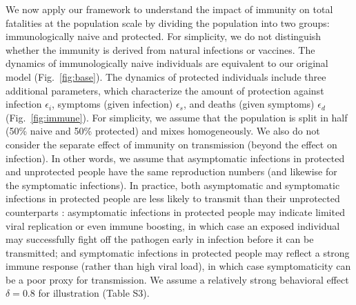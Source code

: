 \documentclass[12pt]{article}
\newcommand{\fref}[1]{Fig.~\ref{fig:#1}}
\begin{document}
We now apply our framework to understand the impact of immunity on total fatalities at the population scale by dividing the population into two groups: immunologically naive and protected.
For simplicity, we do not distinguish whether the immunity is derived from natural infections or vaccines.
The dynamics of immunologically naive individuals are equivalent to our original model (\fref{base}).
The dynamics of protected individuals include three additional parameters, which characterize the amount of protection against infection $\epsilon_i$, symptoms (given infection) $\epsilon_s$, and deaths (given symptoms) $\epsilon_d$ (\fref{immune}).
For simplicity, we assume that the population is split in half (50\% naive and 50\% protected) and mixes homogeneously. We also do not consider the separate effect of immunity on transmission (beyond the effect on infection). 
In other words, we assume that asymptomatic infections in protected and unprotected people have the same reproduction numbers (and likewise for the symptomatic infections).
In practice, both asymptomatic and symptomatic infections in protected people are less likely to transmit than their unprotected counterparts \cite{lipsitch2020understanding}: asymptomatic infections in protected people may indicate limited viral replication or even immune boosting, in which case an exposed individual may successfully fight off the pathogen early in infection before it can be transmitted; and symptomatic infections in protected people may reflect a strong immune response (rather than high viral load), in which case symptomaticity can be a poor proxy for transmission.
We assume a relatively strong behavioral effect $\delta=0.8$ for illustration (Table S3).
\end{document}
